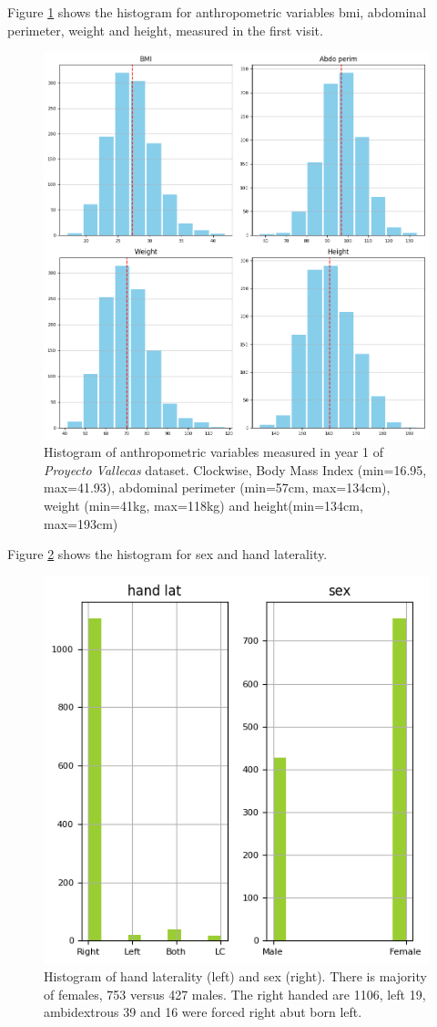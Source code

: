 \documentclass[11pt]{article}
\theoremstyle{definition}
\theoremstyle{remark}
\begin{document}
Figure \ref{fig:anthro} shows the histogram for anthropometric variables bmi, abdominal perimeter, weight and height, measured in the first visit.
\begin{figure}[H]
        \centering
        \includegraphics[keepaspectratio, width=.8\linewidth]{figures/Fig_anthro}
        \caption{Histogram of anthropometric variables measured in year 1 of \emph{Proyecto Vallecas} dataset. Clockwise, Body Mass Index (min=16.95, max=41.93), abdominal perimeter (min=57cm, max=134cm), weight (min=41kg, max=118kg) and height(min=134cm, max=193cm)} 
        \label{fig:anthro}
\end{figure}

Figure \ref{fig:sexlat} shows the histogram for sex and hand laterality.
\begin{figure}[H]
        \centering
        \includegraphics[keepaspectratio, width=.4\linewidth]{figures/Fig_sexlat}
        \caption{Histogram of hand laterality (left) and sex (right). There is majority of females, 753 versus 427 males. The right handed are 1106, left 19, ambidextrous 39 and 16 were forced right abut born left.} 
        \label{fig:sexlat}
\end{figure}
\end{document}
